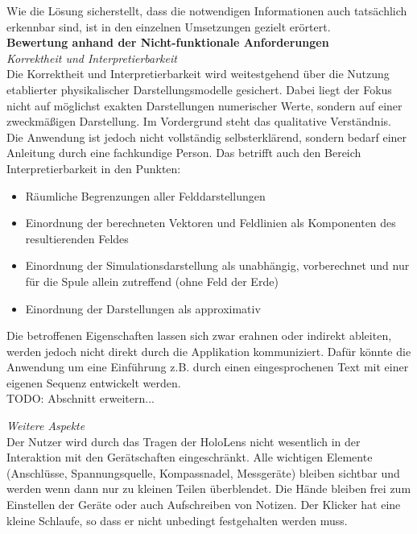 Wie die Lösung sicherstellt, dass die notwendigen Informationen auch tatsächlich erkennbar sind, ist in den einzelnen Umsetzungen gezielt erörtert.\\

\textbf{Bewertung anhand der Nicht-funktionale Anforderungen}\\
\textit{Korrektheit und Interpretierbarkeit}\\
Die Korrektheit und Interpretierbarkeit wird weitestgehend über die Nutzung etablierter physikalischer Darstellungsmodelle gesichert. Dabei liegt der Fokus nicht auf möglichst exakten Darstellungen numerischer Werte, sondern auf einer zweckmäßigen Darstellung. Im Vordergrund steht das qualitative Verständnis.\\

Die Anwendung ist jedoch nicht vollständig selbsterklärend, sondern bedarf einer Anleitung durch eine fachkundige Person. Das betrifft auch den Bereich Interpretierbarkeit in den Punkten:
\begin{itemize}
	\setlength{\itemsep}{-1pt}
	\singlespacing
	\item Räumliche Begrenzungen aller Felddarstellungen
	\item Einordnung der berechneten Vektoren und Feldlinien als Komponenten des resultierenden Feldes
	\item Einordnung der Simulationsdarstellung als unabhängig, vorberechnet und nur für die Spule allein zutreffend (ohne Feld der Erde)
	\item Einordnung der Darstellungen als approximativ
\end{itemize}

Die betroffenen Eigenschaften lassen sich zwar erahnen oder indirekt ableiten, werden jedoch nicht direkt durch die Applikation kommuniziert. Dafür könnte die Anwendung um eine Einführung z.B. durch einen eingesprochenen Text mit einer eigenen Sequenz entwickelt werden.\\

TODO: Abschnitt erweitern...

\textit{Weitere Aspekte}\\
Der Nutzer wird durch das Tragen der HoloLens nicht wesentlich in der Interaktion mit den Gerätschaften eingeschränkt. Alle wichtigen Elemente (Anschlüsse, Spannungsquelle, Kompassnadel, Messgeräte) bleiben sichtbar und werden wenn dann nur zu kleinen Teilen überblendet. Die Hände bleiben frei zum Einstellen der Geräte oder auch Aufschreiben von Notizen. Der Klicker hat eine kleine Schlaufe, so dass er nicht unbedingt festgehalten werden muss.\\

